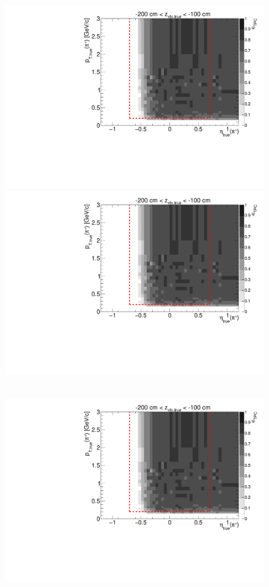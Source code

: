 \begin{figure}[hb]
{  \includegraphics[width=\linewidth,page=7]{graphics/eff/Eff2D_TPC_pion_Plus.pdf}\\
  \includegraphics[width=\linewidth,page=9]{graphics/eff/Eff2D_TPC_pion_Plus.pdf}
}~
\parbox{0.495\textwidth}{
  \centering
  \includegraphics[width=\linewidth,page=4]{graphics/eff/Eff2D_TPC_pion_Plus.pdf}\\
}
\end{figure}
